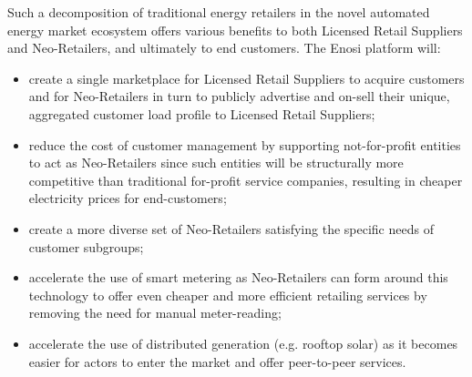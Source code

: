 \documentclass[a4paper,12pt,reqno]{amsart}
\theoremstyle{definition}
\begin{document}
Such a decomposition of traditional energy retailers in the novel automated energy market ecosystem offers various benefits to both Licensed Retail Suppliers and Neo-Retailers, and ultimately to end customers. The Enosi platform will: 
\vspace{-1em}
\begin{itemize}
\item{create a single marketplace for Licensed Retail Suppliers to acquire customers and for Neo-Retailers in turn to publicly advertise and on-sell their unique, aggregated customer load profile to Licensed Retail Suppliers;}
\item{reduce the cost of customer management by supporting not-for-profit entities to act as Neo-Retailers since such entities will be structurally more competitive than traditional for-profit service companies, resulting in cheaper electricity prices for end-customers;}
\item{create a more diverse set of Neo-Retailers satisfying the specific needs of customer subgroups;}
\item{accelerate the use of smart metering as Neo-Retailers can form around this technology to offer even cheaper and more efficient retailing services by removing the need for manual meter-reading;}
\item{accelerate the use of distributed generation (e.g. rooftop solar) as it becomes easier for actors to enter the market and offer peer-to-peer services.}
\end{itemize} 


% 
% 
% 
% 
% 
% 
% 
\end{document}
